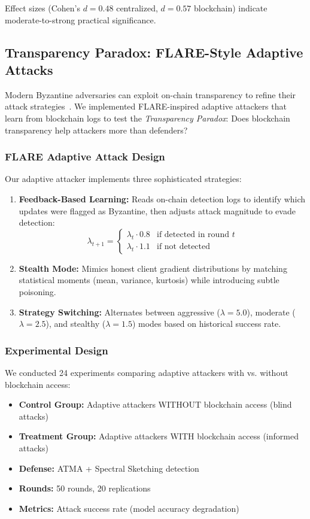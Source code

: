 \documentclass[12pt,a4paper,onecolumn]{article}
\begin{document}
Effect sizes (Cohen's $d=0.48$ centralized, $d=0.57$ blockchain) indicate moderate-to-strong practical significance.

\subsection{Transparency Paradox: FLARE-Style Adaptive Attacks}

Modern Byzantine adversaries can exploit on-chain transparency to refine their attack strategies~\cite{baruch2019little}. We implemented FLARE-inspired adaptive attackers that learn from blockchain logs to test the \emph{Transparency Paradox}: Does blockchain transparency help attackers more than defenders?

\subsubsection{FLARE Adaptive Attack Design}

Our adaptive attacker implements three sophisticated strategies:

\begin{enumerate}
    \item \textbf{Feedback-Based Learning:} Reads on-chain detection logs to identify which updates were flagged as Byzantine, then adjusts attack magnitude to evade detection:
    $$\lambda_{t+1} = \begin{cases}
    \lambda_t \cdot 0.8 & \text{if detected in round } t \\
    \lambda_t \cdot 1.1 & \text{if not detected}
    \end{cases}$$
    
    \item \textbf{Stealth Mode:} Mimics honest client gradient distributions by matching statistical moments (mean, variance, kurtosis) while introducing subtle poisoning.
    
    \item \textbf{Strategy Switching:} Alternates between aggressive ($\lambda=5.0$), moderate ($\lambda=2.5$), and stealthy ($\lambda=1.5$) modes based on historical success rate.
\end{enumerate}

\subsubsection{Experimental Design}

We conducted 24 experiments comparing adaptive attackers with vs. without blockchain access:
\begin{itemize}
    \item \textbf{Control Group:} Adaptive attackers WITHOUT blockchain access (blind attacks)
    \item \textbf{Treatment Group:} Adaptive attackers WITH blockchain access (informed attacks)
    \item \textbf{Defense:} ATMA + Spectral Sketching detection
    \item \textbf{Rounds:} 50 rounds, 20 replications
    \item \textbf{Metrics:} Attack success rate (model accuracy degradation)
\end{itemize}
\end{document}
